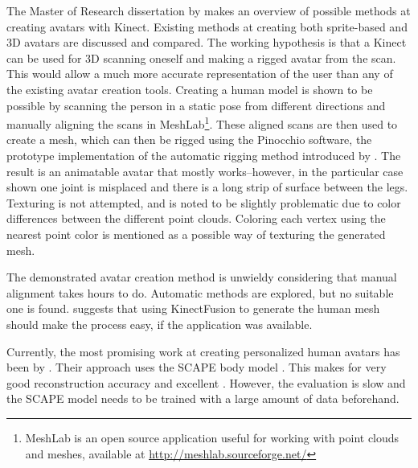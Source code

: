 The Master of Research dissertation by \citet{charpentier2011accurate} makes an overview of possible methods at creating avatars with Kinect. Existing methods at creating both sprite-based and 3D avatars are discussed and compared. The working hypothesis is that a Kinect can be used for 3D scanning oneself and making a rigged avatar from the scan. This would allow a much more accurate representation of the user than any of the existing avatar creation tools. Creating a human model is shown to be possible by scanning the person in a static pose from different directions and manually aligning the scans in MeshLab\footnote{MeshLab is an open source application useful for working with point clouds and meshes, available at \url{http://meshlab.sourceforge.net/}}. These aligned scans are then used to create a mesh, which can then be rigged using the Pinocchio software, the prototype implementation of the automatic rigging method introduced by \citep{baran2007automatic}. The result is an animatable avatar that mostly works--however, in the particular case shown one joint is misplaced and there is a long strip of surface between the legs. Texturing is not attempted, and is noted to be slightly problematic due to color differences between the different point clouds. Coloring each vertex using the nearest point color is mentioned as a possible way of texturing the generated mesh. \citep{charpentier2011accurate}

The demonstrated avatar creation method is unwieldy considering that manual alignment takes hours to do. Automatic methods are explored, but no suitable one is found. \citeauthor{charpentier2011accurate} suggests that using KinectFusion to generate the human mesh should make the process easy, if the application was available. \citep{charpentier2011accurate}


Currently, the most promising work at creating personalized human avatars has been by \citet{weiss2011home}. Their approach uses the SCAPE body model \citep{anguelov2005scape}. This makes for very good reconstruction accuracy and excellent . However, the evaluation is slow and the SCAPE model needs to be trained with a large amount of data beforehand.

